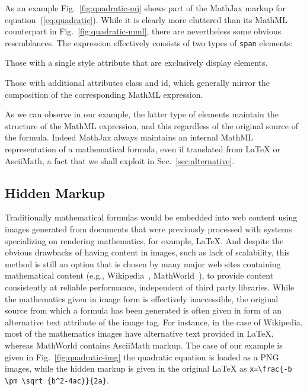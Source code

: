 \documentclass{sig-alternate}
\begin{document}
As an example Fig.~\ref{fig:quadratic-mj} shows part of the MathJax markup for
equation~(\ref{eq:quadratic}). While it is clearly more cluttered than its MathML
counterpart in Fig.~\ref{fig:quadratic-mml}, there are nevertheless some obvious
resemblances. The expression effectively consists of two types of \texttt{span}
elements:
\begin{inparaenum}[(a)]
\item Those with a single style attribute that are exclusively display elements.
\item Those with additional attributes class and id, which generally mirror the
  composition of the corresponding MathML expression.
\end{inparaenum}
As we can observe in our example, the latter type of elements maintain the
structure of the MathML expression, and this regardless of the original source
of the formula. Indeed MathJax always maintains an internal MathML
representation of a mathematical formula, even if translated from {\LaTeX} or
AsciiMath, a fact that we shall exploit in Sec.~\ref{sec:alternative}.


\subsection{Hidden Markup}\label{sec:images}

Traditionally mathematical formulas would be embedded into web content using
images generated from documents that were previously processed with systems
specializing on rendering mathematics, for example, {\LaTeX}. And despite the
obvious drawbacks of having content in images, such as lack of scalability, this
method is still an option that is chosen by many major web sites containing
mathematical content (e.g., Wikipedia~\cite{wikipedia},
MathWorld~\cite{mathworld}), to provide content consistently at reliable
performance, independent of third party libraries.  While the mathematics given
in image form is effectively inaccessible, the original source from which a
formula has been generated is often given in form of an alternative text attribute
of the image tag.  For instance, in the case of Wikipedia, most of the
mathematics images have alternative text provided in {\LaTeX}, whereas MathWorld
contains AsciiMath markup.  The case of our example is given in
Fig.~\ref{fig:quadratic-img} the quadratic equation is loaded as a PNG images,
while the hidden markup is given in the original {\LaTeX} as
\verb+x=\frac{-b \pm \sqrt {b^2-4ac}}{2a}+.
\end{document}
